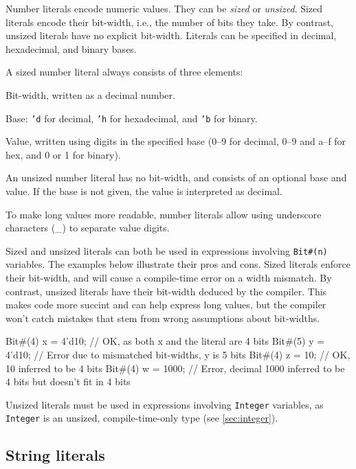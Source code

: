 Number literals encode numeric values. They can be \emph{sized} or \emph{unsized}.
Sized literals encode their bit-width, i.e., the number of bits they take.
By contrast, unsized literals have no explicit bit-width.
Literals can be specified in decimal, hexadecimal, and binary bases.

A sized number literal always consists of three elements:
\begin{compactenum}
\item Bit-width, written as a decimal number.
\item Base: \texttt{'d} for decimal, \texttt{'h} for hexadecimal, and \texttt{'b} for binary.
\item Value, written using digits in the specified base (0--9 for decimal, 0--9 and a--f for hex, and 0 or 1 for binary).
\end{compactenum}

An unsized number literal has no bit-width, and consists of an optional base and value.
If the base is not given, the value is interpreted as decimal.

To make long values more readable, number literals allow
using underscore characters (\_) to separate value digits.

Sized and unsized literals can both be used in expressions involving \verb|Bit#(n)| variables.
The examples below illustrate their pros and cons.
Sized literals enforce their bit-width, and will cause a compile-time error on a width mismatch.
By contrast, unsized literals have their bit-width deduced by the compiler.
This makes code more succint and can help express long values,
but the compiler won't catch mistakes that stem from wrong assumptions about bit-widths.

\begin{mscode}
Bit#(4) x = 4'd10;  // OK, as both x and the literal are 4 bits
Bit#(5) y = 4'd10;  // Error due to mismatched bit-widths, y is 5 bits
Bit#(4) z = 10;     // OK, 10 inferred to be 4 bits
Bit#(4) w = 1000;   // Error, decimal 1000 inferred to be 4 bits but doesn't fit in 4 bits
\end{mscode}

Unsized literals must be used in expressions involving \verb|Integer| variables,
as \verb|Integer| is an unsized, compile-time-only type (see \autoref{sec:integer}).

\subsection{String literals}

